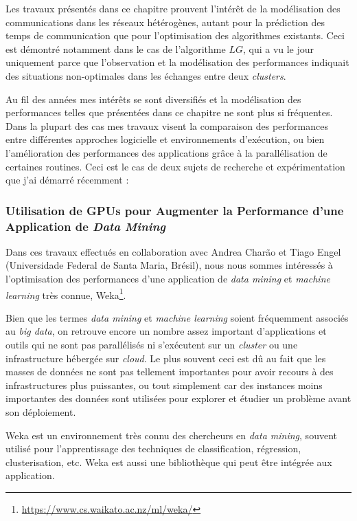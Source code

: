 Les travaux présentés dans ce chapitre prouvent l'intérêt de la modélisation des communications dans les réseaux hétérogènes, autant pour la prédiction des temps de communication que pour l'optimisation des algorithmes existants. Ceci est démontré notamment dans le cas de l'algorithme $LG$, qui a vu le jour uniquement parce que l'observation et la modélisation des performances indiquait des situations non-optimales dans les échanges entre deux \textit{clusters}.

Au fil des années mes intérêts se sont diversifiés et la modélisation des performances telles que présentées dans ce chapitre ne sont plus si fréquentes. Dans la plupart des cas mes travaux visent la comparaison des performances entre différentes approches logicielle et environnements d'exécution, ou bien l'amélioration des performances des applications grâce à la parallélisation de certaines routines. Ceci est le cas de deux sujets de recherche et expérimentation que j'ai démarré récemment :

\subsubsection*{Utilisation de GPUs pour Augmenter la Performance d'une Application de \textit{Data Mining}}

Dans ces travaux effectués en collaboration avec Andrea Charão et Tiago Engel (Universidade Federal de Santa Maria, Brésil), nous nous sommes intéressés à l'optimisation des performances d'une application de \textit{data mining} et \textit{machine learning }très connue, Weka\footnote{\url{https://www.cs.waikato.ac.nz/ml/weka/}}. 

Bien que les termes \textit{data mining} et \textit{machine learning} soient fréquemment associés au \textit{big data}, on retrouve encore un nombre assez important d'applications et outils qui ne sont pas parallélisés ni s'exécutent sur un \textit{cluster} ou une infrastructure hébergée sur \textit{cloud}. Le plus souvent ceci est dû au fait que les masses de données ne sont pas tellement importantes pour avoir recours à des infrastructures plus puissantes, ou tout simplement car des instances moins importantes des données sont utilisées pour explorer et étudier un problème avant son déploiement.

Weka est un environnement très connu des chercheurs en \textit{data mining}, souvent utilisé pour l'apprentissage des techniques de classification, régression, clusterisation, etc. Weka est aussi une bibliothèque qui peut être intégrée aux application.  


